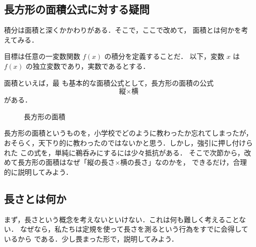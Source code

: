 ﻿%
            \subsection{長方形の面積公式に対する疑問}
                積分は面積と深くかかわりがある．そこで，ここで改めて，
                面積とは何かを考えてみる．

                目標は任意の一変数関数 $f(x)$ の積分を定義することだ．
                以下，変数 $x$ は $f(x)$ の独立変数であり，実数であるとする．

                面積といえば，最
                も基本的な面積公式として，長方形の面積の公式
                    \begin{equation*}
                        \mbox{縦} \times \mbox{横}
                    \end{equation*}
                がある．
                    \begin{figure}[hbt]
                        \begin{center}
                            \caption{長方形の面積}
                            \label{fig:ChouhoukeiMenseki}
                        \end{center}
                    \end{figure}

                長方形の面積というものを，小学校でどのように教わったか忘れてしまったが，
                おそらく，天下り的に教わったのではないかと思う．しかし，強引に押し付けられた
                この式を，単純に鵜呑みにするには少々抵抗がある．
                そこで次節から，改めて長方形の面積はなぜ「縦の長さ$\times$横の長さ」なのかを，
                できるだけ，合理的に説明してみよう．

            \subsection{長さとは何か}
                まず，長さという概念を考えないといけない．これは何も難しく考えることない．
                なぜなら，私たちは定規を使って長さを測るという行為をすでに会得しているから
                である．少し畏まった形で，説明してみよう．

